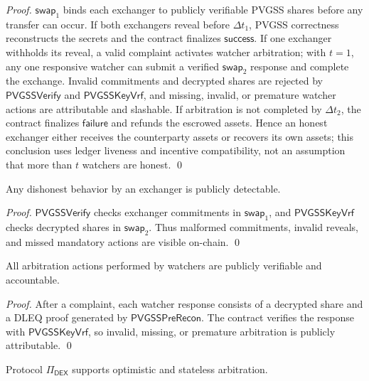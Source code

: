 \documentclass[runningheads]{llncs}
\newcommand{\success}{\mathsf{success}}
\newcommand{\failure}{\mathsf{failure}}
\newcommand{\pvgssVerify}{\mathsf{PVGSSVerify}}
\newcommand{\pvgssPreRecon}{\mathsf{PVGSSPreRecon}}
\newcommand{\pvgssKeyVrf}{\mathsf{PVGSSKeyVrf}}
\begin{document}
\begin{proof}
\(\mathsf{swap}_1\) binds each exchanger to publicly verifiable PVGSS shares
before any transfer can occur. If both exchangers reveal before \(\Delta t_1\),
PVGSS correctness reconstructs the secrets and the contract finalizes
\(\success\). If one exchanger withholds its reveal, a valid complaint activates
watcher arbitration; with \(t=1\), any one responsive watcher can submit a
verified \(\mathsf{swap}_2\) response and complete the exchange. Invalid
commitments and decrypted shares are rejected by \(\pvgssVerify\) and
\(\pvgssKeyVrf\), and missing, invalid, or premature watcher actions are
attributable and slashable. If arbitration is not completed by \(\Delta t_2\),
the contract finalizes \(\failure\) and refunds the escrowed assets. Hence an
honest exchanger either receives the counterparty assets or recovers its own
assets; this conclusion uses ledger liveness and incentive compatibility, not an
assumption that more than \(t\) watchers are honest.
\qed
\end{proof}

\begin{lemma}\label{lem:accountable_exchangers}
Any dishonest behavior by an exchanger is publicly detectable.
\end{lemma}

\begin{proof}
\(\pvgssVerify\) checks exchanger commitments in \(\mathsf{swap}_1\), and
\(\pvgssKeyVrf\) checks decrypted shares in \(\mathsf{swap}_2\). Thus malformed
commitments, invalid reveals, and missed mandatory actions are visible on-chain.
\qed
\end{proof}

\begin{lemma}\label{lem:accountable_watchers}
All arbitration actions performed by watchers are publicly verifiable and
accountable.
\end{lemma}

\begin{proof}
After a complaint, each watcher response consists of a decrypted share and a
DLEQ proof generated by \(\pvgssPreRecon\). The contract verifies the response
with \(\pvgssKeyVrf\), so invalid, missing, or premature arbitration is publicly
attributable.
\qed
\end{proof}

\begin{lemma}
\label{lem:optimistic}
Protocol $\Pi_{\mathsf{DEX}}$ supports optimistic and stateless arbitration.
\end{lemma}
\end{document}
